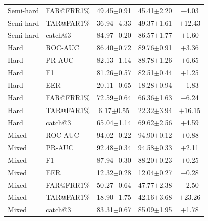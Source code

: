 \documentclass[11pt]{article}
\begin{document}
\begin{table}[!t]
\begin{minipage}[t]{0.48\textwidth}
\begin{tabular}{l l c c c}
Semi-hard & FAR@FRR1\% & 49.45$\pm$0.91 & 45.41$\pm$2.20 & $-$4.03 \\
Semi-hard & TAR@FAR1\% & 36.94$\pm$4.33 & 49.37$\pm$1.61 & $+$12.43 \\
Semi-hard & catch@3    & 84.97$\pm$0.20 & 86.57$\pm$1.77 & $+$1.60 \\
\midrule
Hard      & ROC-AUC    & 86.40$\pm$0.72 & 89.76$\pm$0.91 & $+$3.36 \\
Hard      & PR-AUC     & 82.13$\pm$1.14 & 88.78$\pm$1.26 & $+$6.65 \\
Hard      & F1         & 81.26$\pm$0.57 & 82.51$\pm$0.44 & $+$1.25 \\
Hard      & EER        & 20.11$\pm$0.65 & 18.28$\pm$0.94 & $-$1.83 \\
Hard      & FAR@FRR1\% & 72.59$\pm$0.64 & 66.36$\pm$1.63 & $-$6.24 \\
Hard      & TAR@FAR1\% & \phantom{0}6.17$\pm$0.55 & 22.32$\pm$3.94 & $+$16.15 \\
Hard      & catch@3    & 65.04$\pm$1.14 & 69.62$\pm$2.56 & $+$4.59 \\
\midrule
Mixed     & ROC-AUC    & 94.02$\pm$0.22 & 94.90$\pm$0.12 & $+$0.88 \\
Mixed     & PR-AUC     & 92.48$\pm$0.34 & 94.58$\pm$0.33 & $+$2.11 \\
Mixed     & F1         & 87.94$\pm$0.30 & 88.20$\pm$0.23 & $+$0.25 \\
Mixed     & EER        & 12.32$\pm$0.28 & 12.04$\pm$0.27 & $-$0.28 \\
Mixed     & FAR@FRR1\% & 50.27$\pm$0.64 & 47.77$\pm$2.38 & $-$2.50 \\
Mixed     & TAR@FAR1\% & 18.90$\pm$1.75 & 42.16$\pm$3.68 & $+$23.26 \\
Mixed     & catch@3    & 83.31$\pm$0.67 & 85.09$\pm$1.95 & $+$1.78 \\
\bottomrule
\end{tabular}
\label{tab:app_wc_bert}
\end{minipage}

\vspace{0.6em}


\end{table}
\end{document}
